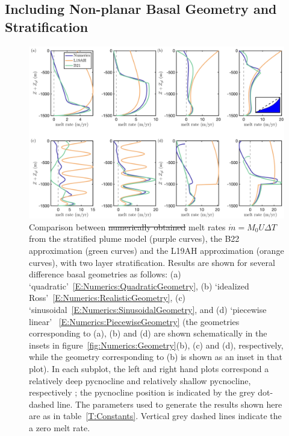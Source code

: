 \documentclass[openacc]{rsproca_new}%
\newcommand{\red}[1]{{\color{red} #1}}
\newcommand{\blue}[1]{{\color{blue} #1}}
\newcommand{\rout}[1]{\red{\st{#1}}}\newcommand{\ab}[1]{\textcolor{Green}{#1}}\newcommand{\about}[1]{\textcolor{Cyan}{\sout{#1}}}
\begin{document}
\subsection{Including Non-planar Basal Geometry and Stratification}
\begin{figure}
\centering
\includegraphics[width = \textwidth]{./make_plots/plots/figure8.png}
\caption{Comparison between \rout{numerically obtained }melt rates $\dot{m}= M_0 U \Delta T$ \blue{from the stratified plume model} (purple curves), the B22 approximation (green curves) and the L19AH approximation (orange curves), with two layer stratification. Results are shown for several difference basal geometries as follows: (a) `quadratic'~\eqref{E:Numerics:QuadraticGeometry}, (b) `idealized Ross'~\eqref{E:Numerics:RealisticGeometry}, (c) `sinusoidal~\eqref{E:Numerics:SinusoidalGeometry}, and (d) `piecewise linear' ~\eqref{E:Numerics:PiecewiseGeometry} (the geometries corresponding to (a), (b) and (d) are shown schematically in the insets in figure~\ref{fig:Numerics:Geometry}(b), (c) and (d), respectively, while the geometry corresponding to (b) is shown as an inset in that plot). In each subplot, the left and right hand plots correspond a relatively deep pycnocline and relatively shallow pycnocline, respectively \blue{; the pycnocline position is indicated by the grey dot-dashed line}. The parameters used to generate the results shown here are as in table~\ref{T:Constants}. \blue{Vertical grey dashed lines indicate the a zero melt rate.} }\label{fig:Numerics:pycnocline_and_geometry_idealized}
\end{figure}
\end{document}
